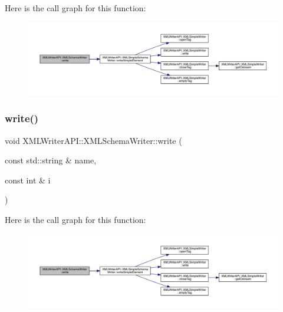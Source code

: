 Here is the call graph for this function\+:
\nopagebreak
\begin{figure}[H]
\begin{center}
\leavevmode
\includegraphics[width=350pt]{db/d34/classXMLWriterAPI_1_1XMLSchemaWriter_a1922edfcbb9d52c70949fd8c8dd97569_cgraph}
\end{center}
\end{figure}
\mbox{\label{classXMLWriterAPI_1_1XMLSchemaWriter_a1b951af62e2106b76e33022c0f1b5d88}} 
\subsubsection{\texorpdfstring{write()}{write()}\hspace{0.1cm}{\footnotesize\ttfamily [4/15]}}
{\footnotesize\ttfamily void X\+M\+L\+Writer\+A\+P\+I\+::\+X\+M\+L\+Schema\+Writer\+::write (\begin{DoxyParamCaption}\item[{const std\+::string \&}]{name,  }\item[{const int \&}]{i }\end{DoxyParamCaption})\hspace{0.3cm}{\ttfamily [inline]}}

Here is the call graph for this function\+:
\nopagebreak
\begin{figure}[H]
\begin{center}
\leavevmode
\includegraphics[width=350pt]{db/d34/classXMLWriterAPI_1_1XMLSchemaWriter_a1b951af62e2106b76e33022c0f1b5d88_cgraph}
\end{center}
\end{figure}
\mbox{\label{classXMLWriterAPI_1_1XMLSchemaWriter_a1b951af62e2106b76e33022c0f1b5d88}} 
